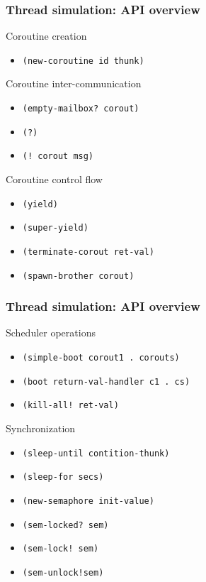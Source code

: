\documentclass{beamer}
\newcommand{\<}[1]{\`#1}
\begin{document}
\begin{frame}
  \frametitle{Thread simulation: API overview}
  \begin{block}{Coroutine creation}
    \begin{itemize}
    \item \texttt{(new-coroutine id thunk)}
    \end{itemize}
  \end{block}

  \begin{block}{Coroutine inter-communication}
    \begin{itemize}
    \item \texttt{(empty-mailbox? corout)}
    \item \texttt{(?)}
    \item \texttt{(! corout msg)}
    \end{itemize}
  \end{block}

  \begin{block}{Coroutine control flow}
    \begin{itemize}
    \item \texttt{(yield)}
    \item \texttt{(super-yield)}
    \item \texttt{(terminate-corout ret-val)}
    \item \texttt{(spawn-brother corout)}
    \end{itemize}
  \end{block}

\end{frame}


\begin{frame}
  \frametitle{Thread simulation: API overview}
  \begin{block}{Scheduler operations}
    \begin{itemize}
    \item \texttt{(simple-boot corout1 . corouts)}
    \item \texttt{(boot return-val-handler c1 . cs)}
    \item \texttt{(kill-all! ret-val)}
    \end{itemize}
  \end{block}

  \begin{block}{Synchronization}
    \begin{itemize}
    \item \texttt{(sleep-until contition-thunk)}
    \item \texttt{(sleep-for secs)}
    \item \texttt{(new-semaphore init-value)}
    \item \texttt{(sem-locked? sem)}
    \item \texttt{(sem-lock! sem)}
    \item \texttt{(sem-unlock!sem)}
    \end{itemize}
  \end{block}

\end{frame}
\end{document}
